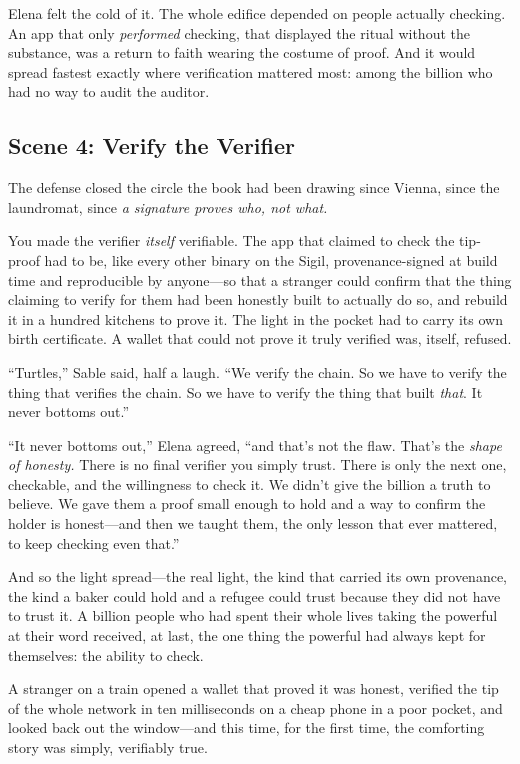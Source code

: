 Elena felt the cold of it. The whole edifice depended on people actually checking.
An app that only \emph{performed} checking, that displayed the ritual without the
substance, was a return to faith wearing the costume of proof. And it would spread
fastest exactly where verification mattered most: among the billion who had no way to
audit the auditor.

\hypertarget{scene-4-verify-the-verifier}{%
\subsection{Scene 4: Verify the
Verifier}\label{scene-4-verify-the-verifier}}

The defense closed the circle the book had been drawing since Vienna, since the
laundromat, since \emph{a signature proves who, not what.}

You made the verifier \emph{itself} verifiable. The app that claimed to check the
tip-proof had to be, like every other binary on the Sigil, provenance-signed at build
time and reproducible by anyone---so that a stranger could confirm that the thing
claiming to verify for them had been honestly built to actually do so, and rebuild it
in a hundred kitchens to prove it. The light in the pocket had to carry its own birth
certificate. A wallet that could not prove it truly verified was, itself, refused.

``Turtles,'' Sable said, half a laugh. ``We verify the chain. So we have to verify the
thing that verifies the chain. So we have to verify the thing that built \emph{that}.
It never bottoms out.''

``It never bottoms out,'' Elena agreed, ``and that's not the flaw. That's the
\emph{shape of honesty.} There is no final verifier you simply trust. There is only
the next one, checkable, and the willingness to check it. We didn't give the billion a
truth to believe. We gave them a proof small enough to hold and a way to confirm the
holder is honest---and then we taught them, the only lesson that ever mattered, to
keep checking even that.''

And so the light spread---the real light, the kind that carried its own provenance, the
kind a baker could hold and a refugee could trust because they did not have to trust
it. A billion people who had spent their whole lives taking the powerful at their word
received, at last, the one thing the powerful had always kept for themselves: the
ability to check.

A stranger on a train opened a wallet that proved it was honest, verified the tip of
the whole network in ten milliseconds on a cheap phone in a poor pocket, and looked
back out the window---and this time, for the first time, the comforting story was
simply, verifiably true.

